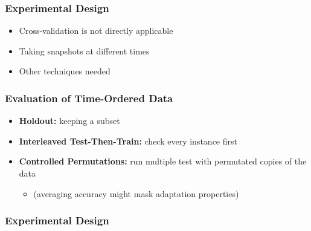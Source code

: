 \begin{frame}
	\frametitle{Experimental Design}
	\begin{itemize}
		\item Cross-validation is not directly applicable
		\item Taking snapshots at different times
		\item Other techniques needed
	\end{itemize}

\end{frame}


\begin{frame}
	\frametitle{Evaluation of Time-Ordered Data}

	\begin{itemize}
		\item \textbf{Holdout:} keeping a subset
		\item \textbf{Interleaved Test-Then-Train:} check every instance first
		\item \textbf{Controlled Permutations:} run multiple test with permutated copies of the data
		\begin{itemize}
			\item (averaging accuracy might mask adaptation properties)
		\end{itemize}
	\end{itemize}

\end{frame}


\begin{frame}
\frametitle{Experimental Design}


\end{frame}


